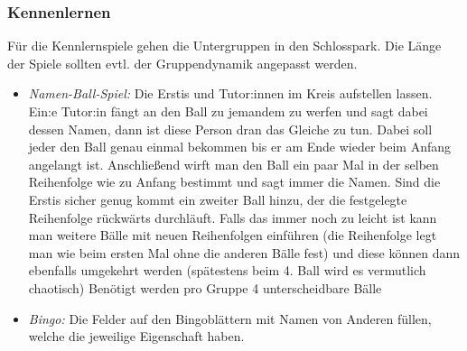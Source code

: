 \documentclass[10pt,ngerman]{scrartcl}
\begin{document}
\begin{multicols}{2}
\subsubsection{Kennenlernen}

Für die Kennlernspiele gehen die Untergruppen in den Schlosspark. Die Länge der
Spiele sollten evtl. der Gruppendynamik angepasst werden.  
\begin{itemize}
    \item \emph{Namen-Ball-Spiel:} Die Erstis und Tutor:innen im  Kreis
        aufstellen lassen.  Ein:e Tutor:in fängt an den Ball zu jemandem zu
        werfen und sagt dabei dessen Namen,  dann ist diese Person dran das
        Gleiche zu tun. Dabei soll jeder den Ball genau einmal bekommen bis er
        am Ende wieder beim Anfang angelangt ist. Anschließend wirft man den
        Ball ein paar Mal in der selben Reihenfolge wie zu Anfang bestimmt und
        sagt immer die Namen.  Sind die Erstis sicher genug kommt ein zweiter
        Ball hinzu,  der die festgelegte Reihenfolge rückwärts durchläuft.
        Falls das immer noch zu leicht ist kann man weitere Bälle mit neuen
        Reihenfolgen einführen (die Reihenfolge legt man wie beim ersten Mal
        ohne die anderen Bälle fest) und diese können dann  ebenfalls umgekehrt
        werden (spätestens beim 4.  Ball wird es vermutlich chaotisch) Benötigt
        werden  pro Gruppe 4 unterscheidbare Bälle 
    \item \emph{Bingo:} 
        Die Felder auf den  Bingoblättern mit Namen von
        Anderen füllen, welche die jeweilige Eigenschaft haben.


\end{itemize}
\end{multicols}
\end{document}
